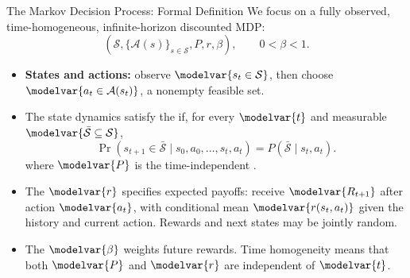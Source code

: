 \begin{frame}{The Markov Decision Process: Formal Definition}
\small
We focus on a fully observed, time-homogeneous, infinite-horizon discounted MDP:
\[(\mathcal S,\{\mathcal A(s)\}_{s\in\mathcal S},P,r,\beta),\qquad 0<\beta<1.\]
\begin{itemize}
  \item \textbf{States and actions:} observe \(\modelvar{s_t\in\mathcal S}\), then choose \(\modelvar{a_t\in\mathcal A(s_t)}\), a nonempty feasible set.
  \item The state dynamics satisfy the  if, for every \(\modelvar{t}\) and measurable \(\modelvar{\bar{\mathcal S}\subseteq\mathcal S}\),
  \[\Pr(s_{t+1}\in\bar{\mathcal S}\mid s_0,a_0,\ldots,s_t,a_t)=P(\bar{\mathcal S}\mid s_t,a_t).\]
  where \(\modelvar{P}\) is the time-independent .
  \item The  \(\modelvar{r}\) specifies expected payoffs: receive \(\modelvar{R_{t+1}}\) after action \(\modelvar{a_t}\), with conditional mean \(\modelvar{r(s_t,a_t)}\) given the history and current action. Rewards and next states may be jointly random.
  \item The  \(\modelvar{\beta}\) weights future rewards. Time homogeneity means that both \(\modelvar{P}\) and \(\modelvar{r}\) are independent of \(\modelvar{t}\).
\end{itemize}
\end{frame}

